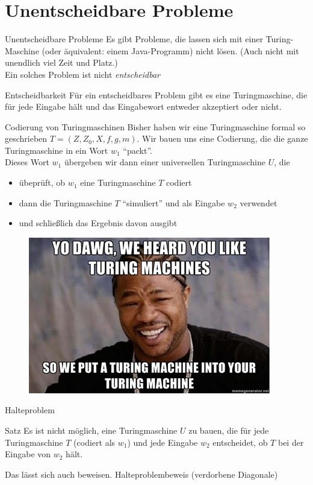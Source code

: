 \section{Unentscheidbare Probleme}
\begin{frame}{Unentscheidbare Probleme}
    Es gibt Probleme, die lassen sich mit einer Turing-Maschine (oder äquivalent: einem Java-Programm) nicht lösen. (Auch nicht mit unendlich viel Zeit und Platz.)\\
    Ein solches Problem ist nicht \emph{entscheidbar}
    \begin{block}{Entscheidbarkeit}
        Für ein entscheidbares Problem gibt es eine Turingmaschine, die für jede Eingabe hält und das Eingabewort entweder akzeptiert oder nicht.
    \end{block}
\end{frame}
\begin{frame}{Codierung von Turingmaschinen}
   Bisher haben wir eine Turingmaschine formal so geschrieben $T = \left( Z, Z_0, X, f, g, m \right)$. Wir bauen uns eine Codierung, die die ganze Turingmaschine in ein Wort $w_1$ ``packt''. \\
   Dieses Wort $w_1$ übergeben wir dann einer universellen Turingmaschine $U$, die 
   \begin{itemize}
       \item übeprüft, ob $w_1$ eine Turingmaschine $T$ codiert
       \item dann die Turingmaschine $T$ ``simuliert'' und als Eingabe $w_2$ verwendet
       \item und schließlich das Ergebnis davon ausgibt
   \end{itemize}
   \begin{figure}[h]
       \centering
       \includegraphics[scale=.5]{graphics/13/33928220.jpg}
   \end{figure}
\end{frame}
\begin{frame}{Halteproblem}
    \begin{block}{Satz}
        Es ist nicht möglich, eine Turingmaschine $U$ zu bauen, die für jede Turingmaschine $T$ (codiert als $w_1$) und jede Eingabe $w_2$  entscheidet, ob $T$ bei der Eingabe von $w_2$ hält.
    \end{block}
    Das lässt sich auch beweisen. 
    Halteproblembeweis (verdorbene Diagonale)
\end{frame}
